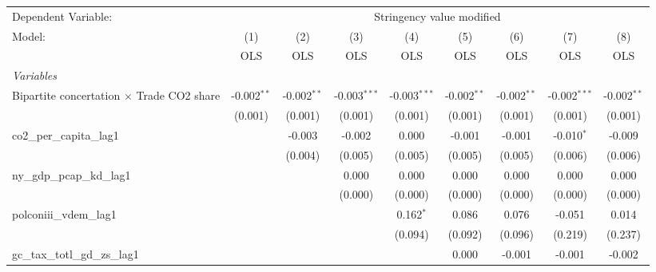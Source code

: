 
\begingroup
\centering
\begin{tabular}{lcccccccc}
   \toprule
   Dependent Variable: & \multicolumn{8}{c}{Stringency value modified}\\
   Model:                                           & (1)           & (2)           & (3)            & (4)            & (5)           & (6)           & (7)            & (8)\\  
                                                    &  OLS          & OLS           & OLS            & OLS            & OLS           & OLS           & OLS            & OLS\\  
   \midrule
   \emph{Variables}\\
   Bipartite concertation $\times$ Trade CO2 share  & -0.002$^{**}$ & -0.002$^{**}$ & -0.003$^{***}$ & -0.003$^{***}$ & -0.002$^{**}$ & -0.002$^{**}$ & -0.002$^{***}$ & -0.002$^{**}$\\   
                                                    & (0.001)       & (0.001)       & (0.001)        & (0.001)        & (0.001)       & (0.001)       & (0.001)        & (0.001)\\   
   co2\_per\_capita\_lag1                           &               & -0.003        & -0.002         & 0.000          & -0.001        & -0.001        & -0.010$^{*}$   & -0.009\\   
                                                    &               & (0.004)       & (0.005)        & (0.005)        & (0.005)       & (0.005)       & (0.006)        & (0.006)\\   
   ny\_gdp\_pcap\_kd\_lag1                          &               &               & 0.000          & 0.000          & 0.000         & 0.000         & 0.000          & 0.000\\   
                                                    &               &               & (0.000)        & (0.000)        & (0.000)       & (0.000)       & (0.000)        & (0.000)\\   
   polconiii\_vdem\_lag1                            &               &               &                & 0.162$^{*}$    & 0.086         & 0.076         & -0.051         & 0.014\\   
                                                    &               &               &                & (0.094)        & (0.092)       & (0.096)       & (0.219)        & (0.237)\\   
   gc\_tax\_totl\_gd\_zs\_lag1                      &               &               &                &                & 0.000         & -0.001        & -0.001         & -0.002\\   

\end{tabular}
